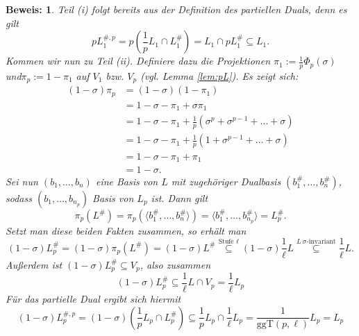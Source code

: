 \documentclass[12pt,a4paper,halfparskip,headsepline,bibtotocnumbered]{scrreprt}
\theoremstyle{nummermitklammern}
\theoremstyle{nonumberbreak}
\newtheorem{beweis}{Beweis:}
\begin{document}
\begin{beweis}
	Teil (i) folgt bereits aus der Definition des partiellen Duals, denn es gilt
	\begin{equation*}
		p L_1^{\#,p} = p \left( \frac{1}{p}L_1 \cap L_1^\# \right) = L_1 \cap p L_1^\# \subseteq L_1.
	\end{equation*}
	Kommen wir nun zu Teil (ii). Definiere dazu die Projektionen $\pi_1 := \frac{1}{p} \Phi_p(\sigma)$ und\linebreak$\pi_p := 1-\pi_1$ auf $V_1$ bzw. $V_p$ (vgl. Lemma \eqref{lem:pL}). Es zeigt sich:
	\begin{align*}
		(1 - \sigma) \pi_p 	&= (1-\sigma) (1 - \pi_1)\\
							&= 1 - \sigma - \pi_1 + \sigma \pi_1\\
							&= 1 - \sigma - \pi_1 + \frac{1}{p} (\sigma^p + \sigma^{p-1} + \dots + \sigma)\\
							&= 1 - \sigma - \pi_1 + \frac{1}{p} (1 + \sigma^{p-1} + \dots + \sigma)\\
							&= 1 - \sigma - \pi_1 + \pi_1\\
							&= 1 - \sigma.
	\end{align*}
	Sei nun $(b_1, \dots, b_n)$ eine Basis von $L$ mit zugehöriger Dualbasis $(b_1^\#, \dots, b_n^\#)$, sodass $(b_1, \dots, b_{n_p})$ Basis von $L_p$ ist. Dann gilt
	\begin{equation*}
		\pi_p(L^\#) = \pi_p(\langle b_1^\#, \dots, b_{n}^\# \rangle) = \langle b_1^\#, \dots, b_{n_p}^\# \rangle = L_p^\#.
	\end{equation*}
	Setzt man diese beiden Fakten zusammen, so erhält man
	\begin{equation*}
		(1 - \sigma) L_p^\# = (1 - \sigma) \pi_p(L^\#) = (1 - \sigma) L^\# \stackrel{\text{Stufe } \ell}{\subseteq} (1 - \sigma) \frac{1}{\ell} L \stackrel{L \ \sigma \text{-invariant}}{\subseteq} \frac{1}{\ell} L.
	\end{equation*}
	Außerdem ist $(1 - \sigma) L_p^\# \subseteq V_p$, also zusammen
	\begin{equation*}
		(1 - \sigma) L_p^\# \subseteq \frac{1}{\ell} L \cap V_p = \frac{1}{\ell} L_p
	\end{equation*}
	Für das partielle Dual ergibt sich hiermit
	\begin{equation*}
		(1-\sigma) L_p^{\#,p} = (1 - \sigma) \left(\frac{1}{p}L_p \cap L_p^\# \right) \subseteq \frac{1}{p} L_p \cap \frac{1}{\ell} L_p  = \frac{1}{\text{ggT}(p, \ell)} L_p = L_p
	\end{equation*}
\end{beweis}
\end{document}
